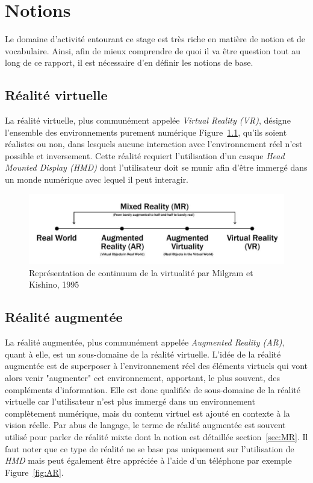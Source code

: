 \newpage
\chapter{Notions}
\label{chap:notions}

Le domaine d'activité entourant ce stage est très riche en matière de notion et de vocabulaire. Ainsi, afin de mieux comprendre de quoi il va être question tout au long de ce rapport, il est nécessaire d'en définir les notions de base.

\section{Réalité virtuelle}
La réalité virtuelle\cite{milgram1995augmented}, plus communément appelée \emph{Virtual Reality (VR)}, désigne l'ensemble des environnements purement numérique Figure~\ref{fig:realityspectrum}, qu'ils soient réalistes ou non, dans lesquels aucune interaction avec l'environnement réel n'est possible et inversement. Cette réalité requiert l'utilisation d'un casque \emph{Head Mounted Display (HMD)} dont l'utilisateur doit se munir afin d'être immergé dans un monde numérique avec lequel il peut interagir.

\begin{figure}[H]
\centering
\includegraphics[width=\linewidth]{images/RealitySpectrum}
\caption{Représentation de continuum de la virtualité par Milgram et Kishino, 1995\cite{milgram1995augmented}}
\label{fig:realityspectrum}
\end{figure}

\section{Réalité augmentée}
La réalité augmentée\cite{milgram1995augmented}, plus communément appelée \emph{Augmented Reality (AR)}, quant à elle, est un sous-domaine de la réalité virtuelle. L'idée de la réalité augmentée est de superposer à l'environnement réel des éléments virtuels qui vont alors venir "augmenter" cet environnement, apportant, le plus souvent, des compléments d'information. Elle est donc qualifiée de sous-domaine de la réalité virtuelle car l'utilisateur n'est plus immergé dans un environnement complètement numérique, mais du contenu virtuel est ajouté en contexte à la vision réelle. Par abus de langage, le terme de réalité augmentée est souvent utilisé pour parler de réalité mixte dont la notion est détaillée section~\ref{sec:MR}.
Il faut noter que ce type de réalité ne se base pas uniquement sur l'utilisation de \emph{HMD} mais peut également être appréciée à l'aide d'un téléphone par exemple Figure~\ref{fig:AR}.

